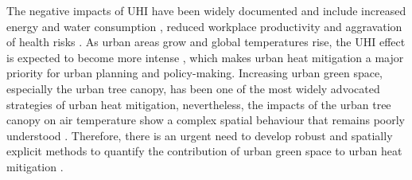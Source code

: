 \documentclass[10pt,letterpaper]{article}
\begin{document}
The negative impacts of UHI have been widely documented and include increased energy and water consumption \cite{akbari2001cool,golden2006energy,santamouris2015impact}, reduced workplace productivity \cite{kjellstrom2009workplace,zander2015heat} and aggravation of health risks \cite{chestnut1998analysis,kovats2008heat,laaidi2012impact}.
As urban areas grow and global temperatures rise, the UHI effect is expected to become more intense \cite{meehl2004more,huang2019projecting}, which makes urban heat mitigation a major priority for urban planning and policy-making.
Increasing urban green space, especially the urban tree canopy, has been one of the most widely advocated strategies of urban heat mitigation, nevertheless, the impacts of the urban tree canopy on air temperature show a complex spatial behaviour that remains poorly understood \cite{bowler2010urban,phelan2015urban,koc2018evaluating}.
Therefore, there is an urgent need to develop robust and spatially explicit methods to quantify the contribution of urban green space to urban heat mitigation \cite{haaland2015challenges,artmann2019urban}.

\end{document}
